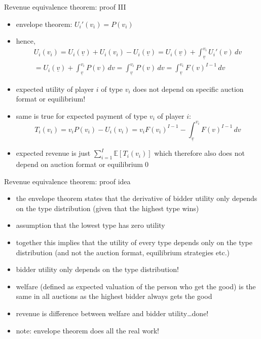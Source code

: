 \documentclass[bigger]{beamer}
\begin{document}
\begin{frame}[label={sec:org66631a2}]{Revenue equivalence theorem: proof III}
\begin{itemize}
\item envelope theorem: \(U_i'(v_i)=P(v_i)\)
\item hence,
\begin{multline*}U_i(v_i)=U_i(\underline v) + U_i(v_i)-U_i(\underline v)=U_i(\underline v)+\int_{\underline v}^{v_i}U_i'(v)\,dv\\=U_i(\underline v)+\int_{\underline v}^{v_i}P(v)\,dv=\int_{\underline v}^{v_i}P(v)\,dv= \int_{\underline v}^{v_i}F(v)^{I-1}\,dv\end{multline*}
\item expected utility of player \(i\) of type \(v_i\) does not depend on specific auction format or equilibrium!
\item same is true for expected payment of type \(v_i\) of player \(i\):
$$T_i(v_i)=v_i P(v_i) -U_i(v_i)=v_i F(v_i)^{I-1} -\int_{\underline v}^{v_i}F(v)^{I-1}\,dv$$
\item expected revenue is just \(\sum_{i=1}^I \mathbb{E}[T_i(v_i)]\) which therefore also does not depend on auction format or equilibrium\qed
\end{itemize}
\end{frame}

\begin{frame}[label={sec:org5774cf2}]{Revenue equivalence theorem: proof idea}
\begin{itemize}
\item the envelope theorem states that the derivative of bidder utility only depends on the type distribution (given that the highest type wins)
\item assumption that the lowest type has zero utility
\item together this implies that the utility of every type depends only on the type distribution (and not the auction format, equilibrium strategies etc.)
\item bidder utility only depends on the type distribution!
\item welfare (defined as expected valuation of the person who get the good) is the same in all auctions as the highest bidder always gets the good
\item revenue is difference between welfare and bidder utility\ldots{}done!
\item note: envelope theorem does all the real work!
\end{itemize}
\end{frame}
\end{document}
